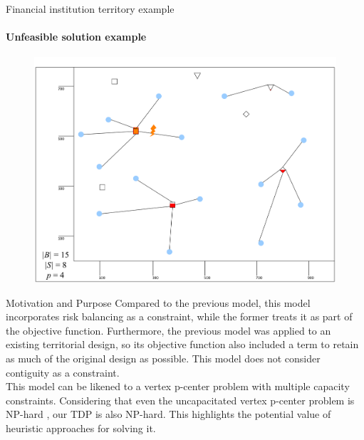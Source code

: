 \documentclass{beamer}
\begin{document}
\begin{frame}{Financial institution territory example}
    \framesubtitle{Unfeasible solution example}
    \begin{figure}
        \centering
        \includegraphics[scale=0.08]{inst_mala.pdf}
        \label{fig:instancia}
    \end{figure}
\end{frame}

\begin{frame}{Motivation and Purpose}
    Compared to the previous model, this model incorporates risk balancing as a constraint, while the former treats it as part of the objective function. Furthermore, the previous model was applied to an existing territorial design, so its objective function also included a term to retain as much of the original design as possible. This model does not consider contiguity as a constraint.
    \\
    This model can be likened to a vertex p-center problem with multiple capacity constraints. Considering that even the uncapacitated vertex p-center problem is NP-hard \cite{eswa2016}, our TDP is also NP-hard. This highlights the potential value of heuristic approaches for solving it.
\end{frame}
\end{document}
